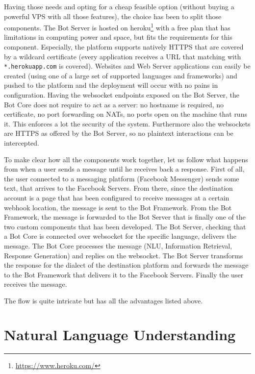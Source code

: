 Having those needs and opting for a cheap feasible option (without buying a powerful VPS with all those features), the choice has been to split those components. The Bot Server is hosted on heroku\footnote{\url{https://www.heroku.com/}} with a free plan that has limitations in computing power and space, but fits the requirements for this component. Especially, the platform supports natively HTTPS that are covered by a wildcard certificate (every application receives a URL that matching with \texttt{*.herokuapp.com} is covered). Websites and Web Server applications can easily be created (using one of a large set of supported languages and frameworks) and pushed to the platform and the deployment will occur with no pains in configuration. Having the websocket endpoints exposed on the Bot Server, the Bot Core does not require to act as a server: no hostname is required, no certificate, no port forwarding on NATs, no ports open on the machine that runs it. This enforces a lot the security of the system. Furthermore also the websockets are HTTPS as offered by the Bot Server, so no plaintext interactions can be intercepted.

To make clear how all the components work together, let us follow what happens from when a user sends a message until he receives back a response. First of all, the user connected to a messaging platform (Facebook Messenger) sends some text, that arrives to the Facebook Servers. From there, since the destination account is a page that has been configured to receive messages at a certain webhook location, the message is sent to the Bot Framework. From the Bot Framework, the message is forwarded to the Bot Server that is finally one of the two custom components that has been developed. The Bot Server, checking that a Bot Core is connected over websocket for the specific language, delivers the message. The Bot Core processes the message (NLU, Information Retrieval, Response Generation) and replies on the websocket. The Bot Server transforms the response for the dialect of the destination platform and forwards the message to the Bot Framework that delivers it to the Facebook Servers. Finally the user receives the message.

The flow is quite intricate but has all the advantages listed above.

\section{Natural Language Understanding}
\label{implementationNLU}

